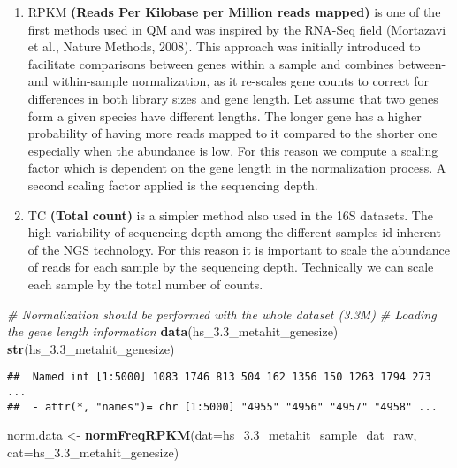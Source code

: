 \documentclass[]{article}
\newenvironment{Shaded}{\begin{snugshade}}{\end{snugshade}}
\newcommand{\KeywordTok}[1]{\textcolor[rgb]{0.13,0.29,0.53}{\textbf{{#1}}}}
\newcommand{\DataTypeTok}[1]{\textcolor[rgb]{0.13,0.29,0.53}{{#1}}}
\newcommand{\StringTok}[1]{\textcolor[rgb]{0.31,0.60,0.02}{{#1}}}
\newcommand{\CommentTok}[1]{\textcolor[rgb]{0.56,0.35,0.01}{\textit{{#1}}}}
\newcommand{\NormalTok}[1]{{#1}}
\begin{document}
\begin{enumerate}
\def\labelenumi{\arabic{enumi}.}
\itemsep1pt\parskip0pt
\item
  RPKM \textbf{(Reads Per Kilobase per Million reads mapped)} is one of
  the first methods used in QM and was inspired by the RNA-Seq field
  (Mortazavi et al., Nature Methods, 2008). This approach was initially
  introduced to facilitate comparisons between genes within a sample and
  combines between- and within-sample normalization, as it re-scales
  gene counts to correct for differences in both library sizes and gene
  length. Let assume that two genes form a given species have different
  lengths. The longer gene has a higher probability of having more reads
  mapped to it compared to the shorter one especially when the abundance
  is low. For this reason we compute a scaling factor which is dependent
  on the gene length in the normalization process. A second scaling
  factor applied is the sequencing depth.\\
\item
  TC \textbf{(Total count)} is a simpler method also used in the 16S
  datasets. The high variability of sequencing depth among the different
  samples id inherent of the NGS technology. For this reason it is
  important to scale the abundance of reads for each sample by the
  sequencing depth. Technically we can scale each sample by the total
  number of counts.
\end{enumerate}

\begin{Shaded}
\begin{Highlighting}[]
\CommentTok{# Normalization should be performed with the whole dataset (3.3M) }
\CommentTok{# Loading the gene length information}
\KeywordTok{data}\NormalTok{(hs_3.3_metahit_genesize)}
\KeywordTok{str}\NormalTok{(hs_3.3_metahit_genesize)}
\end{Highlighting}
\end{Shaded}

\begin{verbatim}
##  Named int [1:5000] 1083 1746 813 504 162 1356 150 1263 1794 273 ...
##  - attr(*, "names")= chr [1:5000] "4955" "4956" "4957" "4958" ...
\end{verbatim}

\begin{Shaded}
\begin{Highlighting}[]
\NormalTok{norm.data <-}\StringTok{ }\KeywordTok{normFreqRPKM}\NormalTok{(}\DataTypeTok{dat=}\NormalTok{hs_3.3_metahit_sample_dat_raw, }
                          \DataTypeTok{cat=}\NormalTok{hs_3.3_metahit_genesize)}
\end{Highlighting}
\end{Shaded}
\end{document}
